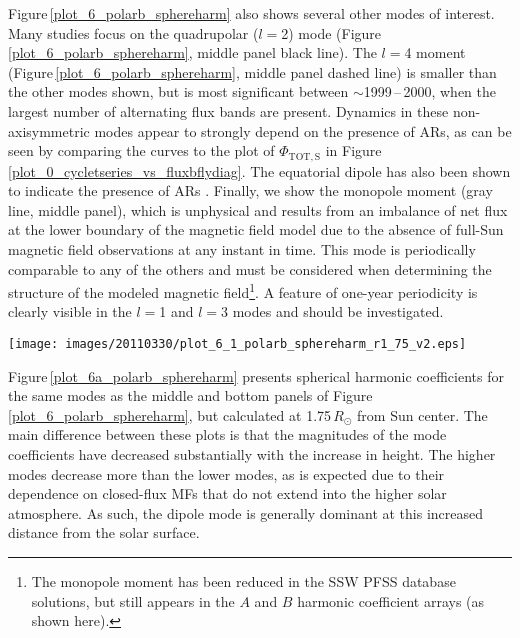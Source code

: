 \documentclass[namedreferences]{solarphysics}
\newcommand{\degr}{\ensuremath{^\circ}}
\begin{document}
\begin{article}
Figure\,\ref{plot_6_polarb_sphereharm} also shows several other modes of interest. Many studies \citep[e.g.,][]{mordvinov:2007,DeRosa:2012} focus on the quadrupolar ($l$$=$2) mode (Figure\,\ref{plot_6_polarb_sphereharm}, middle panel black line).
The $l$$=$4 moment (Figure\,\ref{plot_6_polarb_sphereharm}, middle panel dashed line) is smaller than the other modes shown, but is most significant between $\sim$1999\,--\,2000, when the largest number of alternating flux bands are present. Dynamics in these non-axisymmetric modes appear to strongly depend on the presence of ARs, as can be seen by comparing the curves to the plot of $\Phi_{\mathrm{TOT,S}}$ in Figure\,\ref{plot_0_cycletseries_vs_fluxbflydiag}. The equatorial dipole has also been shown to indicate the presence of ARs \citep{Petrie:2013}. Finally, we show the monopole moment (gray line, middle panel), which is unphysical and results from an imbalance of net flux at the lower boundary of the magnetic field model due to the absence of full-Sun magnetic field observations at any instant in time. This mode is periodically comparable to any of the others and must be considered when determining the structure of the modeled magnetic field\footnote{The monopole moment has been reduced in the SSW PFSS database solutions, but still appears in the $A$ and $B$ harmonic coefficient arrays (as shown here).}. A feature of one-year periodicity is clearly visible in the $l$$=$1 and  $l$$=$3 modes and should be investigated.


\begin{figure*}[!t]
\texttt{[image: images/20110330/plot\_6\_1\_polarb\_sphereharm\_r1\_75\_v2.eps]}
\caption{PFSS spherical harmonic coefficients as in the middle and bottom panels of Figure\,\ref{plot_6_polarb_sphereharm}, but calculated at a height of 1.75\,$R_{\odot}$ from Sun center.}
\label{plot_6a_polarb_sphereharm}
\end{figure*}

Figure\,\ref{plot_6a_polarb_sphereharm} presents spherical harmonic coefficients for the same modes as the middle and bottom panels of Figure\,\ref{plot_6_polarb_sphereharm}, but calculated at 1.75\,$R_{\odot}$ from Sun center. The main difference between these plots is that the magnitudes of the mode coefficients have decreased substantially with the increase in height. The higher modes decrease more than the lower modes, as is expected due to their dependence on closed-flux MFs that do not extend into the higher solar atmosphere. As such, the dipole mode is generally dominant at this increased distance from the solar surface. 




\end{article}
\end{document}
